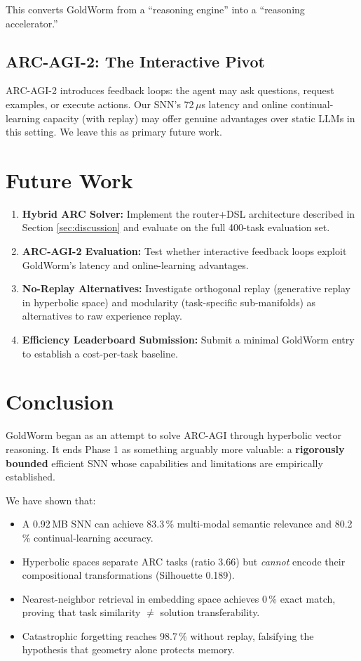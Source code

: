 \documentclass[11pt,a4paper]{article}
\begin{document}
This converts GoldWorm from a ``reasoning engine'' into a ``reasoning accelerator.''

\subsection{ARC-AGI-2: The Interactive Pivot}

ARC-AGI-2 introduces feedback loops: the agent may ask questions, request examples, or execute actions. Our SNN's 72\,$\mu$s latency and online continual-learning capacity (with replay) may offer genuine advantages over static LLMs in this setting. We leave this as primary future work.

\section{Future Work}
\label{sec:future}

\begin{enumerate}
    \item \textbf{Hybrid ARC Solver:} Implement the router+DSL architecture described in Section \ref{sec:discussion} and evaluate on the full 400-task evaluation set.
    \item \textbf{ARC-AGI-2 Evaluation:} Test whether interactive feedback loops exploit GoldWorm's latency and online-learning advantages.
    \item \textbf{No-Replay Alternatives:} Investigate orthogonal replay (generative replay in hyperbolic space) and modularity (task-specific sub-manifolds) as alternatives to raw experience replay.
    \item \textbf{Efficiency Leaderboard Submission:} Submit a minimal GoldWorm entry to establish a cost-per-task baseline.
\end{enumerate}

\section{Conclusion}
\label{sec:conclusion}

GoldWorm began as an attempt to solve ARC-AGI through hyperbolic vector reasoning. It ends Phase 1 as something arguably more valuable: a \textbf{rigorously bounded} efficient SNN whose capabilities and limitations are empirically established.

We have shown that:
\begin{itemize}
    \item A 0.92\,MB SNN can achieve 83.3\,\% multi-modal semantic relevance and 80.2\,\% continual-learning accuracy.
    \item Hyperbolic spaces separate ARC tasks (ratio 3.66) but \emph{cannot} encode their compositional transformations (Silhouette 0.189).
    \item Nearest-neighbor retrieval in embedding space achieves 0\,\% exact match, proving that task similarity $\neq$ solution transferability.
    \item Catastrophic forgetting reaches 98.7\,\% without replay, falsifying the hypothesis that geometry alone protects memory.
\end{itemize}
\end{document}
